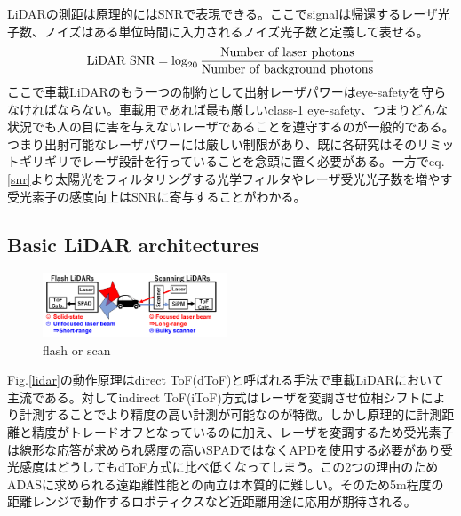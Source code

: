 \documentclass[letterpaper, 10 pt, conference]{ieeeconf}  %
\begin{document}
LiDARの測距は原理的にはSNRで表現できる。ここでsignalは帰還するレーザ光子数、ノイズはある単位時間に入力されるノイズ光子数と定義して表せる\cite{yoshioka201820}。
\begin{eqnarray}
    \centering
    \textrm{LiDAR SNR} = \log_{20}{\frac{\textrm{Number of laser photons}}{\textrm{Number of background photons}}}
    \label{snr}
\end{eqnarray}
ここで車載LiDARのもう一つの制約として出射レーザパワーはeye-safetyを守らなければならない。車載用であれば最も厳しいclass-1 eye-safety、つまりどんな状況でも人の目に害を与えないレーザであることを遵守するのが一般的である。つまり出射可能なレーザパワーには厳しい制限があり、既に各研究はそのリミットギリギリでレーザ設計を行っていることを念頭に置く必要がある。一方でeq.\ref{snr}より太陽光をフィルタリングする光学フィルタやレーザ受光光子数を増やす受光素子の感度向上はSNRに寄与することがわかる。


\subsection{Basic LiDAR architectures}
\begin{figure}[!t]
\centering
 \includegraphics[width=0.49\textwidth]{figs/flashscan.png}
  \caption{flash or scan}
\label{flash}
\end{figure}

Fig.\ref{lidar}の動作原理はdirect ToF(dToF)と呼ばれる手法で車載LiDARにおいて主流である。対してindirect ToF(iToF)方式はレーザを変調させ位相シフトにより計測することでより精度の高い計測が可能なのが特徴\cite{kawahito2007cmos, bamji20140, bamji2018impixel, keel2019vga}。しかし原理的に計測距離と精度がトレードオフとなっているのに加え、レーザを変調するため受光素子は線形な応答が求められ感度の高いSPADではなくAPDを使用する必要があり受光感度はどうしてもdToF方式に比べ低くなってしまう。この2つの理由のためADASに求められる遠距離性能との両立は本質的に難しい。そのため5m程度の距離レンジで動作するロボティクスなど近距離用途に応用が期待される\cite{yoshioka2021through}。
\end{document}
